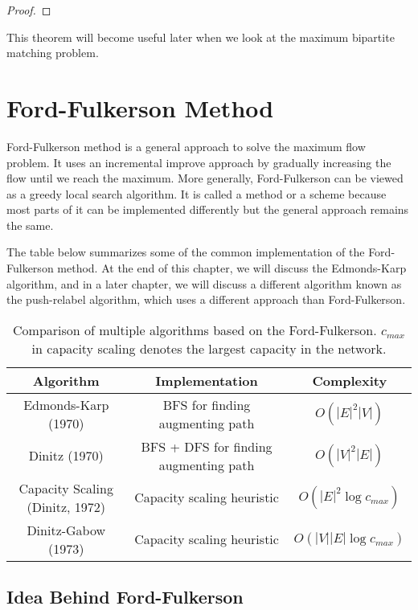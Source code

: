 \begin{proof}
    
\end{proof}

This theorem will become useful later when we look at the maximum bipartite matching problem.

\section{Ford-Fulkerson Method}

Ford-Fulkerson method is a general approach to solve the maximum flow problem. It uses an incremental improve approach by gradually increasing the flow until we reach the maximum. More generally, Ford-Fulkerson can be viewed as a greedy local search algorithm. It is called a method or a scheme because most parts of it can be implemented differently but the general approach remains the same.

The table below summarizes some of the common implementation of the Ford-Fulkerson method. At the end of this chapter, we will discuss the Edmonds-Karp algorithm, and in a later chapter, we will discuss a different algorithm known as the push-relabel algorithm, which uses a different approach than Ford-Fulkerson.

\begin{table}[htpb]
    \centering
    \begin{tabular}{c|c|c}
    Algorithm & Implementation & Complexity \\
    \hline
    Edmonds-Karp (1970) & BFS for finding augmenting path & $O(|E|^2|V|)$ \\
    Dinitz (1970) & BFS + DFS for finding augmenting path & $O(|V|^2 |E|)$ \\
    Capacity Scaling (Dinitz, 1972) & Capacity scaling heuristic & $O(|E|^2 \log c_{max})$ \\
    Dinitz-Gabow (1973) & Capacity scaling heuristic & $O(|V||E| \log c_{max})$ 
    \end{tabular}
    \caption{Comparison of multiple algorithms based on the Ford-Fulkerson. $c_{max}$ in capacity scaling denotes the largest capacity in the network.}
    \label{tab:ford-fulkerson}
\end{table}

\subsection{Idea Behind Ford-Fulkerson}

